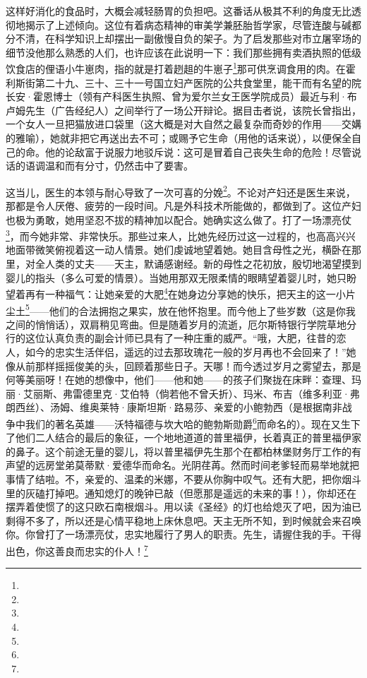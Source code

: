这样好消化的食品时，大概会减轻肠胃的负担吧。这番话从极其不利的角度无比透彻地揭示了上述倾向。这位有着病态精神的审美学兼胚胎哲学家，尽管连酸与碱都分不清，在科学知识上却摆出一副傲慢自负的架子。为了启发那些对市立屠宰场的细节没他那么熟悉的人们，也许应该在此说明一下：我们那些拥有卖酒执照的低级饮食店的俚语小牛崽肉，指的就是打着趔趄的牛崽子\footnote{}那可供烹调食用的肉。在霍利斯街第二十九、三十、三十一号国立妇产医院的公共食堂里，能干而有名望的院长安·霍恩博士（领有产科医生执照、曾为爱尔兰女王医学院成员）最近与利·布卢姆先生（广告经纪人）之间举行了一场公开辩论。据目击者说，该院长曾指出，一个女人一旦把猫放进口袋里（这大概是对大自然之最复杂而奇妙的作用——交媾的雅喻），她就非把它再送出去不可；或赐予它生命（用他的话来说），以便保全自己的命。他的论敌富于说服力地驳斥说：这可是冒着自己丧失生命的危险！尽管说话的语调温和而有分寸，仍然击中了要害。
\par 这当儿，医生的本领与耐心导致了一次可喜的分娩\footnote{}。不论对产妇还是医生来说，那都是令人厌倦、疲劳的一段时间。凡是外科技术所能做的，都做到了。这位产妇也极为勇敢，她用坚忍不拔的精神加以配合。她确实这么做了。打了一场漂亮仗\footnote{}，而今她非常、非常快乐。那些过来人，比她先经历过这一过程的，也高高兴兴地面带微笑俯视着这一动人情景。她们虔诚地望着她。她目含母性之光，横卧在那里，对全人类的丈夫——天主，默诵感谢经。新的母性之花初放，殷切地渴望摸到婴儿的指头（多么可爱的情景）。当她用那双无限柔情的眼睛望着婴儿时，她只盼望着再有一种福气：让她亲爱的大肥\footnote{}在她身边分享她的快乐，把天主的这一小片尘土\footnote{}——他们的合法拥抱之果实，放在他怀抱里。而今他上了些岁数（这是你我之间的悄悄话），双肩稍见弯曲。但是随着岁月的流逝，厄尔斯特银行学院草地分行的这位认真负责的副会计师已具有了一种庄重的威严。“哦，大肥，往昔的恋人，如今的忠实生活伴侣，遥远的过去那玫瑰花一般的岁月再也不会回来了！”她像从前那样摇摇俊美的头，回顾着那些日子。天哪！而今透过岁月之雾望去，那是何等美丽呀！在她的想像中，他们——他和她——的孩子们聚拢在床畔：查理、玛丽·艾丽斯、弗雷德里克·艾伯特（倘若他不曾夭折）、玛米、布吉（维多利亚·弗朗西丝）、汤姆、维奥莱特·康斯坦斯·路易莎、亲爱的小鲍勃西（是根据南非战争中我们的著名英雄——沃特福德与坎大哈的鲍勃斯勋爵\footnote{}而命名的）。现在又生下了他们二人结合的最后的象征，一个地地道道的普里福伊，长着真正的普里福伊家的鼻子。这个前途无量的婴儿，将以普里福伊先生那个在都柏林堡财务厅工作的有声望的远房堂弟莫蒂默·爱德华而命名。光阴荏苒。然而时间老爹轻而易举地就把事情了结啦。不，亲爱的、温柔的米娜，不要从你胸中叹气。还有大肥，把你烟斗里的灰磕打掉吧。通知熄灯的晚钟已敲（但愿那是遥远的未来的事！），你却还在摆弄着使惯了的这只欧石南根烟斗。用以读《圣经》的灯也给熄灭了吧，因为油已剩得不多了，所以还是心情平稳地上床休息吧。天主无所不知，到时候就会来召唤你。你曾打了一场漂亮仗，忠实地履行了男人的职责。先生，请握住我的手。干得出色，你这善良而忠实的仆人！\footnote{}

